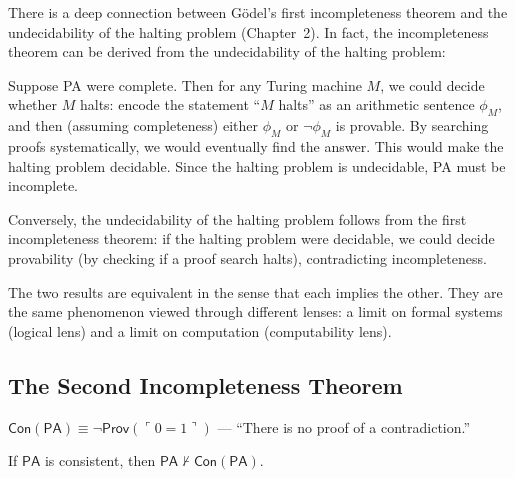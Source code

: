 There is a deep connection between Gödel's first incompleteness theorem and the undecidability of the halting problem (Chapter~2). In fact, the incompleteness theorem can be derived from the undecidability of the halting problem:

Suppose PA were complete. Then for any Turing machine $M$, we could decide whether $M$ halts: encode the statement ``$M$ halts'' as an arithmetic sentence $\phi_M$, and then (assuming completeness) either $\phi_M$ or $\neg \phi_M$ is provable. By searching proofs systematically, we would eventually find the answer. This would make the halting problem decidable. Since the halting problem is undecidable, PA must be incomplete.

Conversely, the undecidability of the halting problem follows from the first incompleteness theorem: if the halting problem were decidable, we could decide provability (by checking if a proof search halts), contradicting incompleteness.

The two results are equivalent in the sense that each implies the other. They are the same phenomenon viewed through different lenses: a limit on formal systems (logical lens) and a limit on computation (computability lens).

\subsection{The Second Incompleteness Theorem}
\label{sec:godel:second}

\begin{definition}
$\mathsf{Con}(\mathsf{PA}) \equiv \neg \mathsf{Prov}(\ulcorner 0=1 \urcorner)$ --- ``There is no proof of a contradiction.''
\end{definition}

\begin{theorem}
If $\mathsf{PA}$ is consistent, then $\mathsf{PA} \nvdash \mathsf{Con}(\mathsf{PA})$.
\end{theorem}

